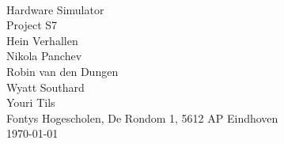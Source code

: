 \documentclass[11pt, a4paper]{report}
\begin{document}
\pagestyle{empty}
\centering
\fontsize{2cm}{2cm}\selectfont{Plan of Approach} \\
\vspace{2mm}
\fontsize{1cm}{1cm}\selectfont Hardware Simulator \\
\vspace{2mm}
\large Project S7\\
\normalsize
\vspace{4cm}
\vfill
\normalsize Hein Verhallen \\
Nikola Panchev \\
Robin van den Dungen \\
Wyatt Southard \\
Youri Tils \\
Fontys Hogescholen, De Rondom 1, 5612 AP Eindhoven \\
\today
\end{document}
